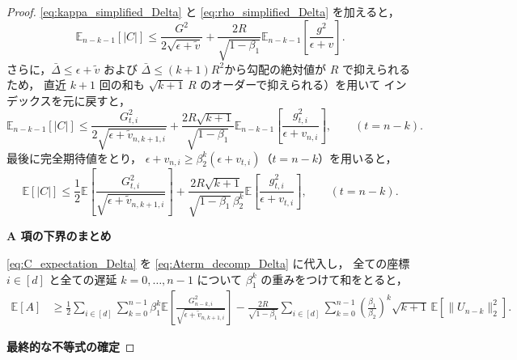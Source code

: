 \documentclass[dvipdfmx,a4paper,11pt]{jsarticle}
\begin{document}
\begin{proof}
\eqref{eq:kappa_simplified_Delta} と \eqref{eq:rho_simplified_Delta} を加えると，
\begin{equation}
    \mathbb{E}_{n-k-1}[|C|]
    \leq \frac{G^2}{2\sqrt{\epsilon+\tilde{v}}}
    + \frac{2R}{\sqrt{1-\beta_1}}
      \mathbb{E}_{n-k-1}\!\left[\frac{g^2}{\epsilon+v}\right].
    \tag{A.25}
    \label{eq:C_bound_Delta}
\end{equation}
さらに，\(\bar{\Delta} \leq \epsilon+\tilde{v}\) および
\(\bar{\Delta} \leq (k+1)R^2\)から勾配の絶対値が $R$ で抑えられるため，
直近 $k+1$ 回の和も \(\sqrt{k+1}\,R\) のオーダーで抑えられる）を用いて
インデックスを元に戻すと，
\begin{equation}
    \mathbb{E}_{n-k-1}[|C|]
    \leq \frac{G_{t,i}^2}{2\sqrt{\epsilon+\tilde{v}_{n,k+1,i}}}
    + \frac{2R\sqrt{k+1}}{\sqrt{1-\beta_1}}
      \mathbb{E}_{n-k-1}\!\left[\frac{g_{t,i}^2}{\epsilon+v_{n,i}}\right],
    \qquad(t = n-k).
    \tag{A.26}
    \label{eq:C_final_Delta}
\end{equation}
最後に完全期待値をとり，
\(\epsilon + v_{n,i} \geq \beta_2^k(\epsilon+v_{t,i})\)（\(t=n-k\)）を用いると，
\begin{equation}
    \mathbb{E}[|C|]
    \leq \frac{1}{2}\mathbb{E}\!\left[
      \frac{G_{t,i}^2}{\sqrt{\epsilon+\tilde{v}_{n,k+1,i}}}
    \right]
    + \frac{2R\sqrt{k+1}}{\sqrt{1-\beta_1}\,\beta_2^k}
      \mathbb{E}\!\left[\frac{g_{t,i}^2}{\epsilon+v_{t,i}}\right],
    \qquad(t = n-k).
    \tag{A.27}
    \label{eq:C_expectation_Delta}
\end{equation}

\bigskip
\noindent
\textbf{A 項の下界のまとめ}

\eqref{eq:C_expectation_Delta} を
\eqref{eq:Aterm_decomp_Delta} に代入し，
全ての座標 $i \in [d]$ と全ての遅延 $k = 0, \ldots, n-1$ について
$\beta_1^k$ の重みをつけて和をとると，
\begin{align}
    \mathbb{E}[A]
    &\geq
    \frac{1}{2} \sum_{i \in [d]} \sum_{k=0}^{n-1} \beta_1^k
    \mathbb{E}\!\left[
      \frac{G_{n-k,i}^2}{\sqrt{\epsilon+\tilde{v}_{n,k+1,i}}}
    \right]
    - \frac{2R}{\sqrt{1-\beta_1}}
      \sum_{i \in [d]} \sum_{k=0}^{n-1}
      \left(\frac{\beta_1}{\beta_2}\right)^k \sqrt{k+1}\,
      \mathbb{E}\!\left[\|U_{n-k}\|_2^2\right].
    \tag{A.28}
    \label{eq:A_lower_Delta}
\end{align}

\bigskip
\noindent
\textbf{最終的な不等式の確定}


\end{proof}
\end{document}

